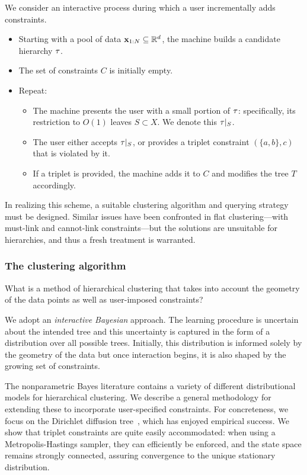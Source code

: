 We consider an interactive process during which a user incrementally adds constraints.
\begin{itemize}
\item Starting with a pool of data $\mathbf{x}_{1:N} \subseteq \mathbb{R}^d$, the machine builds a candidate hierarchy $\tau$.
\item The set of constraints $C$ is initially empty.
\item Repeat:
\begin{itemize}
\item The machine presents the user with a small portion of $\tau$: specifically, its restriction to $O(1)$ leaves $S \subset X$. We denote this $\tau|_S$.
\item The user either accepts $\tau|_S$, or provides a triplet constraint $(\{a,b\},c)$ that is violated by it.
\item If a triplet is provided, the machine adds it to $C$ and modifies the tree $T$ accordingly.
\end{itemize}
\end{itemize}
In realizing this scheme, a suitable clustering algorithm and querying strategy must be designed. Similar issues have been confronted in flat clustering---with must-link and cannot-link constraints---but the solutions are unsuitable for hierarchies, and thus a fresh treatment is warranted.

\subsubsection*{The clustering algorithm}

What is a method of hierarchical clustering that takes into account the geometry of the data points as well as user-imposed constraints? 

We adopt an \emph{interactive Bayesian} approach. The learning procedure is uncertain about the intended tree and this uncertainty is captured in the form of a distribution over all possible trees. Initially, this distribution is informed solely by the geometry of the data but once interaction begins, it is also shaped by the growing set of constraints.

The nonparametric Bayes literature contains a variety of different distributional models for hierarchical clustering. We describe a general methodology for extending these to incorporate user-specified constraints. For concreteness, we focus on the Dirichlet diffusion tree~\citep{Neal2003}, which has enjoyed empirical success. We show that triplet constraints are quite easily accommodated: when using a Metropolis-Hastings sampler, they can efficiently be enforced, and the state space remains strongly connected, assuring convergence to the unique stationary distribution.

